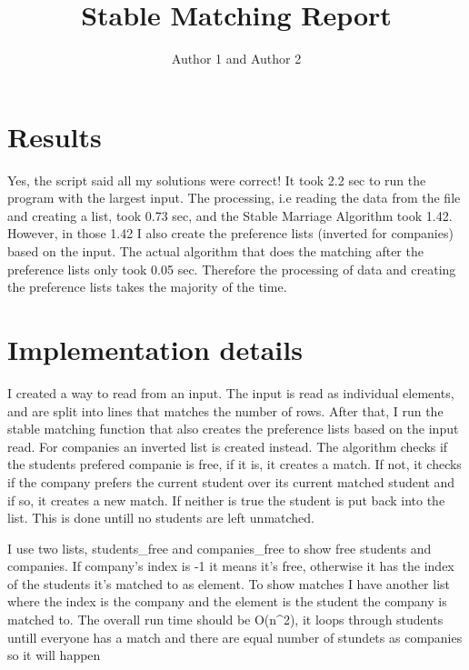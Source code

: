 \documentclass{article}
\title{Stable Matching Report}
\author{Author 1 and Author 2}
\begin{document}
  \maketitle

  \section{Results}

    Yes, the script said all my solutions were correct! It took 2.2 sec to run the program with the largest input. The processing, i.e reading the data from the file and creating a list, took 0.73 sec, and the Stable Marriage Algorithm took 1.42. However, in those 1.42 I also create the preference lists (inverted for companies) based on the input. The actual algorithm that does the matching after the preference lists only took 0.05 sec. Therefore the processing of data and creating the preference lists takes the majority of the time. 

  \section{Implementation details}
    I created a way to read from an input. The input is read as individual elements, and are split into lines that matches the number of rows. After that, I run the stable matching function that also creates the preference lists based on the input read. For companies an inverted list is created instead. The algorithm checks if the students prefered companie is free, if it is, it creates a match. If not, it checks if the company prefers the current student over its current matched student and if so, it creates a new match. If neither is true the student is put back into the list. This is done untill no students are left unmatched.
    

    I use two lists, students_free and companies_free to show free students and companies. If company's index is -1 it means it's free, otherwise it has the index of the students it's matched to as element. 
    To show matches I have another list where the index is the company and the element is the student the company is matched to. 
    The overall run time should be O(n^2), it loops through students untill everyone has a match and there are equal number of stundets as companies so it will happen 
\end{document}
